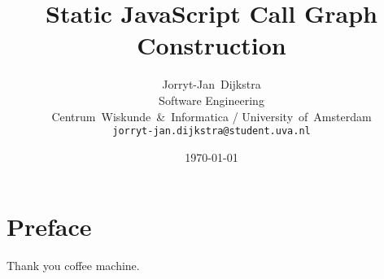 \documentclass[journal,10pt]{IEEEtran} %
\begin{document}
\title{Static JavaScript Call Graph Construction}
\author{Jorryt-Jan~Dijkstra \\ Software Engineering \\ Centrum~Wiskunde~\&~Informatica / University~of~Amsterdam \\ \texttt{jorryt-jan.dijkstra@student.uva.nl}}
\date{\today}

\maketitle



\section*{Preface}
Thank you coffee machine.



\end{document}
